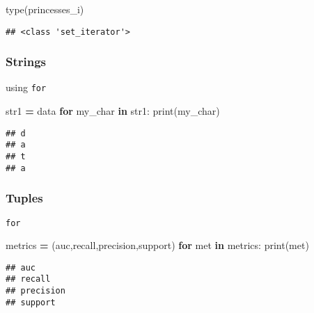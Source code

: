 \documentclass[
]{book}
\newenvironment{Shaded}{\begin{snugshade}}{\end{snugshade}}
\newcommand{\BuiltInTok}[1]{#1}
\newcommand{\ControlFlowTok}[1]{\textcolor[rgb]{0.13,0.29,0.53}{\textbf{#1}}}
\newcommand{\KeywordTok}[1]{\textcolor[rgb]{0.13,0.29,0.53}{\textbf{#1}}}
\newcommand{\NormalTok}[1]{#1}
\newcommand{\OperatorTok}[1]{\textcolor[rgb]{0.81,0.36,0.00}{\textbf{#1}}}
\newcommand{\StringTok}[1]{\textcolor[rgb]{0.31,0.60,0.02}{#1}}
\begin{document}
\begin{Shaded}
\begin{Highlighting}[]
\BuiltInTok{type}\NormalTok{(princesses\_i)}
\end{Highlighting}
\end{Shaded}

\begin{verbatim}
## <class 'set_iterator'>
\end{verbatim}

\subsubsection{Strings}\label{strings}

using \texttt{for}

\begin{Shaded}
\begin{Highlighting}[]
\NormalTok{str1 }\OperatorTok{=} \StringTok{\textquotesingle{}data\textquotesingle{}}
\ControlFlowTok{for}\NormalTok{ my\_char }\KeywordTok{in}\NormalTok{ str1:}
    \BuiltInTok{print}\NormalTok{(my\_char)}
\end{Highlighting}
\end{Shaded}

\begin{verbatim}
## d
## a
## t
## a
\end{verbatim}

\subsubsection{Tuples}\label{tuples}

\texttt{for}

\begin{Shaded}
\begin{Highlighting}[]
\NormalTok{metrics }\OperatorTok{=}\NormalTok{ (}\StringTok{\textquotesingle{}auc\textquotesingle{}}\NormalTok{,}\StringTok{\textquotesingle{}recall\textquotesingle{}}\NormalTok{,}\StringTok{\textquotesingle{}precision\textquotesingle{}}\NormalTok{,}\StringTok{\textquotesingle{}support\textquotesingle{}}\NormalTok{)}
\ControlFlowTok{for}\NormalTok{ met }\KeywordTok{in}\NormalTok{ metrics:}
    \BuiltInTok{print}\NormalTok{(met)}
\end{Highlighting}
\end{Shaded}

\begin{verbatim}
## auc
## recall
## precision
## support
\end{verbatim}
\end{document}
